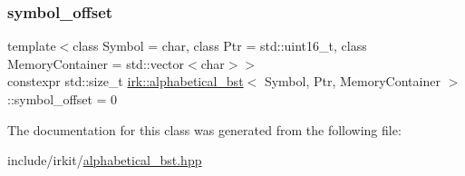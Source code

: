 \subsubsection{\texorpdfstring{symbol\+\_\+offset}{symbol\_offset}}
{\footnotesize\ttfamily template$<$class Symbol = char, class Ptr = std\+::uint16\+\_\+t, class Memory\+Container = std\+::vector$<$char$>$$>$ \\
constexpr std\+::size\+\_\+t \mbox{\hyperlink{classirk_1_1alphabetical__bst}{irk\+::alphabetical\+\_\+bst}}$<$ Symbol, Ptr, Memory\+Container $>$\+::symbol\+\_\+offset = 0\hspace{0.3cm}{\ttfamily [static]}}



The documentation for this class was generated from the following file\+:\begin{DoxyCompactItemize}
\item 
include/irkit/\mbox{\hyperlink{alphabetical__bst_8hpp}{alphabetical\+\_\+bst.\+hpp}}\end{DoxyCompactItemize}
